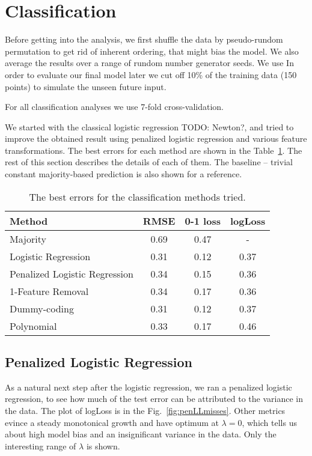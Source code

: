 \documentclass{article} %
\newcommand{\todo}[1]{}
\renewcommand{\todo}[1]{{\color{red} TODO: {#1}}}
\begin{document}
\section{Classification}

Before getting into the analysis, we first shuffle the data by pseudo-rundom permutation to get rid of inherent ordering, that might bias the model. We also average the results over a range of rundom number generator seeds. We use In order to evaluate our final model later we cut off 10\% of the training data (150 points) to simulate the unseen future input.

For all classification analyses we use 7-fold cross-validation. 

We started with the classical logistic regression \todo{Newton?}, and tried to improve the obtained result using penalized logistic regression and various feature transformations. The best errors for each method are shown in the Table~\ref{tab:classification-errors}. The rest of this section describes the details of each of them. The baseline -- trivial constant majority-based prediction is also shown for a reference.
\begin{table}[h]
  \begin{center}
    \begin{tabular}{l|ccc}
      Method & RMSE & 0-1 loss & logLoss \\
      \hline
      Majority & 0.69 & 0.47 & - \\
      Logistic Regression & 0.31 & 0.12 & 0.37 \\
      Penalized Logistic Regression & 0.34 & 0.15 & 0.36  \\
      1-Feature Removal & 0.34 & 0.17 & 0.36 \\
      Dummy-coding & 0.31 & 0.12 & 0.37 \\
      Polynomial & 0.33 & 0.17 & 0.46
    \end{tabular}
    \caption{The best errors for the classification methods tried.}
    \label{tab:classification-errors}
  \end{center}
\end{table}

\subsection{Penalized Logistic Regression}
As a natural next step after the logistic regression, we ran a penalized logistic regression, to see how much of the test error can be attributed to the variance in the data. The plot of logLoss is in the Fig.~\ref{fig:penLLmisses}. Other metrics evince a steady monotonical growth and have optimum at $\lambda = 0$, which tells us about high model bias and an insignificant variance in the data. Only the interesting range of $\lambda$ is shown.
\end{document}

